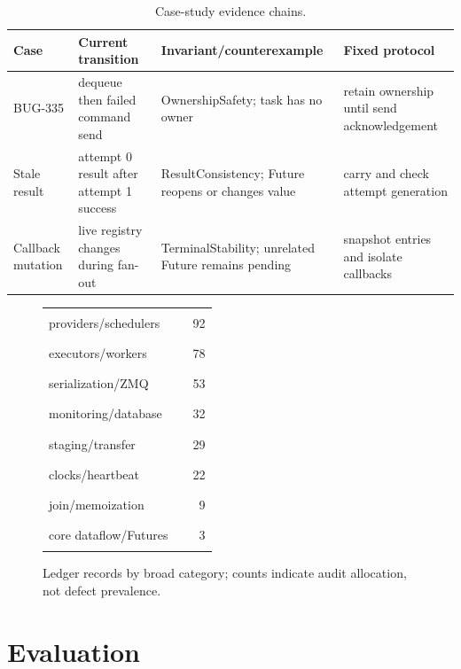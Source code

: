 \documentclass[11pt,a4paper]{article}
\newenvironment{tabularx}[2]{\begin{tabular}{#2}}{\end{tabular}}
\begin{document}
\begin{table}[h]
\centering
\caption{Case-study evidence chains.}
\normalsize
\begin{tabularx}{\textwidth}{>{\raggedright\arraybackslash}p{0.16\textwidth} p{0.23\textwidth} p{0.28\textwidth} p{0.24\textwidth}}
\toprule
Case & Current transition & Invariant/counterexample & Fixed protocol \\
\midrule
BUG-335 & dequeue then failed command send & OwnershipSafety; task has no owner & retain ownership until send acknowledgement \\
Stale result & attempt 0 result after attempt 1 success & ResultConsistency; Future reopens or changes value & carry and check attempt generation \\
Callback mutation & live registry changes during fan-out & TerminalStability; unrelated Future remains pending & snapshot entries and isolate callbacks \\
\bottomrule
\end{tabularx}
\end{table}

\begin{figure}[h]
\centering
\begin{tabular}{p{} l r}
providers/schedulers & \textcolor{blue}{\rule{0.45\textwidth}{0.8ex}} & 92 \\
executors/workers & \textcolor{blue}{\rule{0.38\textwidth}{0.8ex}} & 78 \\
serialization/ZMQ & \textcolor{blue}{\rule{0.26\textwidth}{0.8ex}} & 53 \\
monitoring/database & \textcolor{blue}{\rule{0.16\textwidth}{0.8ex}} & 32 \\
staging/transfer & \textcolor{blue}{\rule{0.14\textwidth}{0.8ex}} & 29 \\
clocks/heartbeat & \textcolor{blue}{\rule{0.11\textwidth}{0.8ex}} & 22 \\
join/memoization & \textcolor{blue}{\rule{0.05\textwidth}{0.8ex}} & 9 \\
core dataflow/Futures & \textcolor{blue}{\rule{0.02\textwidth}{0.8ex}} & 3
\end{tabular}
\caption{Ledger records by broad category; counts indicate audit allocation, not defect prevalence.}
\label{fig:ledger}
\end{figure}

\section{Evaluation}
\end{document}
